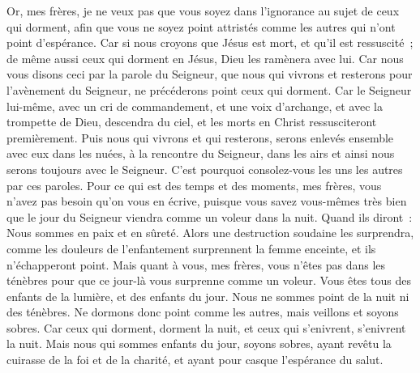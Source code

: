 \begin{multicols}{2}
Or, mes frères, je ne veux pas que vous soyez dans l'ignorance au sujet de ceux qui dorment, afin que vous ne soyez point attristés comme les autres qui n'ont point d'espérance. 
Car si nous croyons que Jésus est mort, et qu'il est ressuscité~; de même aussi ceux qui dorment en Jésus, Dieu les ramènera avec lui.
Car nous vous disons ceci par la parole du Seigneur, que nous qui vivrons et resterons pour l'avènement du Seigneur, ne précéderons point ceux qui dorment.
Car le Seigneur lui-même, avec un cri de commandement, et une voix d'archange, et avec la trompette de Dieu, descendra du ciel, et les morts en Christ ressusciteront premièrement.
Puis nous qui vivrons et qui resterons, serons enlevés ensemble avec eux dans les nuées, à la rencontre du Seigneur, dans les airs et ainsi nous serons toujours avec le Seigneur. 
C'est pourquoi consolez-vous les uns les autres par ces paroles.
\VerseOne{}Pour ce qui est des temps et des moments, mes frères, vous n'avez pas besoin qu'on vous en écrive,
puisque vous savez vous-mêmes très bien que le jour du Seigneur viendra comme un voleur dans la nuit.
Quand ils diront~: Nous sommes en paix et en sûreté. Alors une destruction soudaine les surprendra, comme les douleurs de l'enfantement surprennent la femme enceinte, et ils n'échapperont point.
Mais quant à vous, mes frères, vous n'êtes pas dans les ténèbres pour que ce jour-là vous surprenne comme un voleur.
Vous êtes tous des enfants de la lumière, et des enfants du jour. Nous ne sommes point de la nuit ni des ténèbres.
Ne dormons donc point comme les autres, mais veillons et soyons sobres.
Car ceux qui dorment, dorment la nuit, et ceux qui s'enivrent, s'enivrent la nuit.
Mais nous qui sommes enfants du jour, soyons sobres, ayant revêtu la cuirasse de la foi et de la charité, et ayant pour casque l'espérance du salut.

\end{multicols}
